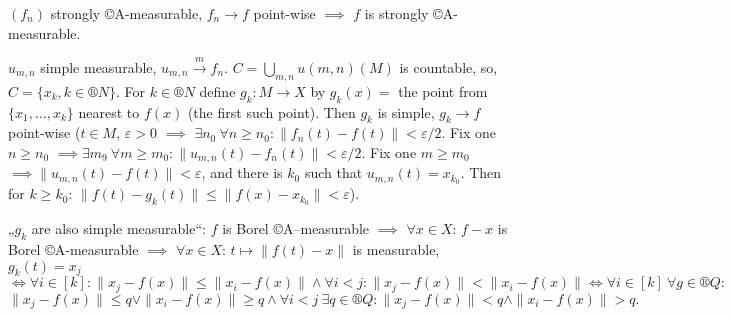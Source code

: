 \documentclass[12pt]{article}					%
\begin{document}
\begin{lemma}
	$(f_n)$ strongly ©A-measurable, $f_n \rightarrow f$ point-wise $\implies$ $f$ is strongly ©A-measurable.

	\begin{dukazin}
		$u_{m, n}$ simple measurable, $u_{m, n} \overset{m}\rightarrow f_n$. $C = \underset{{m, n}}\bigcup u(m, n)(M)$ is countable, so, $C = \{x_k, k \in ®N\}$. For $k \in ®N$ define $g_k: M \rightarrow X$ by $g_k(x) = $ the point from $\{x_1, …, x_k\}$ nearest to $f(x)$ (the first such point). Then $g_k$ is simple, $g_k \rightarrow f$ point-wise ($t \in M$, $ε > 0$ $\implies$ $\exists n_0\ \forall n ≥ n_0: \|f_n(t) - f(t)\| < ε/2$. Fix one $n ≥ n_0$ $\implies \exists m_9\ \forall m ≥ m_0: \|u_{m, n}(t) - f_n(t)\| < ε/2$. Fix one $m ≥ m_0$ $\implies \|u_{m, n}(t) - f(t)\| < ε$, and there is $k_0$ such that $u_{m, n}(t) = x_{k_0}$. Then for $k ≥ k_0$: $\|f(t) - g_k(t)\| ≤ \|f(x) - x_{k_0}\| < ε$).

		„$g_k$ are also simple measurable“: $f$ is Borel ©A–measurable $\implies$ $\forall x \in X$: $f - x$ is Borel ©A-measurable $\implies$ $\forall x \in X$: $t \mapsto \|f(t) - x\|$ is measurable, $g_k(t) = x_j$
		$$ \Leftrightarrow \forall i \in [k]: \|x_j - f(x)\| ≤ \|x_i - f(x)\| \land \forall i < j: \|x_j - f(x)\| < \|x_i - f(x)\| \Leftrightarrow \forall i \in [k]\ \forall g \in ®Q:$$
		$$ \|x_j - f(x)\| ≤ q \lor \|x_i - f(x)\| ≥ q \land \forall i < j\ \exists q \in ®Q: \|x_j - f(x)\| < q \land \|x_i - f(x)\| > q. $$
	\end{dukazin}
\end{lemma}
\end{document}
